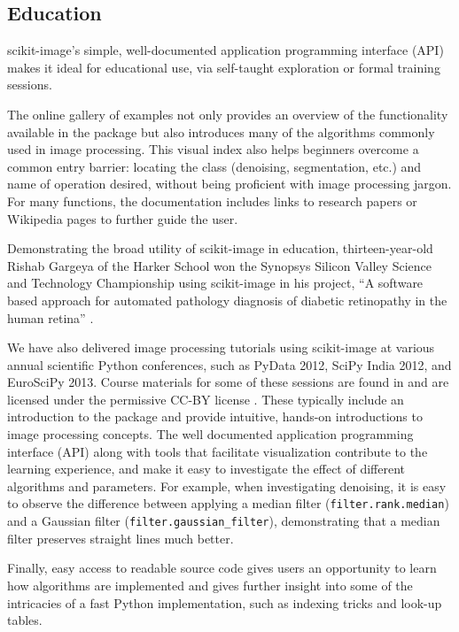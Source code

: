
  \subsection*{Education}
    \label{education}

    scikit-image's simple, well-documented application programming interface (API) makes it ideal for educational use, via self-taught exploration or formal training sessions.

    The online gallery of examples not only provides an overview of the functionality available in the package but also introduces many of the algorithms commonly used in image processing. This visual index also helps beginners overcome a common entry barrier: locating the class (denoising, segmentation, etc.) and name of operation desired, without being proficient with image processing jargon.  For many functions, the documentation includes links to research papers or Wikipedia pages to further guide the user.

    Demonstrating the broad utility of scikit-image in education, thirteen-year-old Rishab Gargeya of the Harker School won the Synopsys Silicon Valley Science and Technology Championship using scikit-image in his project, ``A software based approach for automated pathology diagnosis of diabetic retinopathy in the human retina'' \citep{sciencefair}.

    We have also delivered image processing tutorials using scikit-image at various annual scientific Python conferences, such as PyData 2012, SciPy India 2012, and EuroSciPy 2013. Course materials for some of these sessions are found in \cite{scipylecturenotes} and are licensed under the permissive CC-BY license \citep{cc-by}. These typically include an introduction to the package and provide intuitive, hands-on introductions to image processing concepts. The well documented application programming interface (API) along with tools that facilitate visualization contribute to the learning experience, and make it easy to investigate the effect of different algorithms and parameters. For example, when investigating denoising, it is easy to observe the difference between applying a median filter (\texttt{filter.rank.median}) and a Gaussian filter (\texttt{filter.gaussian\_filter}), demonstrating that a median filter preserves straight lines much better.

    Finally, easy access to readable source code gives users an opportunity to learn how algorithms are implemented and gives further insight into some of the intricacies of a fast Python implementation, such as indexing tricks and look-up tables.
